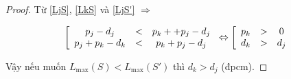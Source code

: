 \begin{proof}
	Từ \eqref{LjS}, \eqref{LkS} và \eqref{LjS'}
	$\Rightarrow$

	\begin{equation*}
		\left[
			\begin{array}{c c c}
				p_j - d_j & < & p_k + + p_j - d_j \\
				p_j + p_k - d_k & < & p_k + p_j - d_j
			\end{array}
		\right.
		\Leftrightarrow
		\left[
			\begin{array}{c c c}
				p_k & > & 0 \\
				d_k & > & d_j
			\end{array}
		\right.
	\end{equation*}

	Vậy nếu muốn $L_{\max}(S) < L_{\max}(S')$ thì $d_k > d_j$ (đpcm).
\end{proof}

